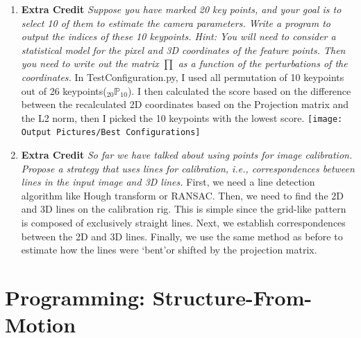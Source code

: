 \documentclass[11pt]{article}
\begin{document}
\begin{enumerate}
        \item \textbf{Extra Credit} \textit{Suppose you have marked 20 key points, and your goal is to select 10 of
        them to estimate the camera parameters. Write a program to output the indices of these 10 keypoints. Hint:
        You will need to consider a statistical model for the pixel and 3D coordinates of the feature points. Then
        you need to write out the matrix $\prod$ as a function of the perturbations of the coordinates.}\newline
        In TestConfiguration.py, I used all permutation of 10 keypoints out of 26 keypoints($_{20}\mathbb{P}_{10}$).
        I then calculated the score based on the difference between the recalculated 2D coordinates based on the
        Projection matrix and the L2 norm, then I picked the 10 keypoints with the lowest score.\newline
        \texttt{[image: Output Pictures/Best Configurations]}\newline

        \item \textbf{Extra Credit} \textit{So far we have talked about using points for image calibration. Propose a
        strategy that uses lines for calibration, i.e., correspondences between lines in the input image and 3D
        lines.}\newline
        First, we need a line detection algorithm like Hough transform or RANSAC. Then, we need to find the 2D and 3D
        lines on the calibration rig. This is simple since the grid-like pattern is composed of exclusively straight
        lines. Next, we establish correspondences between the 2D and 3D lines. Finally, we use the same method as
        before to estimate how the lines were \textquoteleft bent\textquoteright or shifted by the projection matrix.\newline
    \end{enumerate}


    \section{Programming: Structure-From-Motion}
\end{document}
